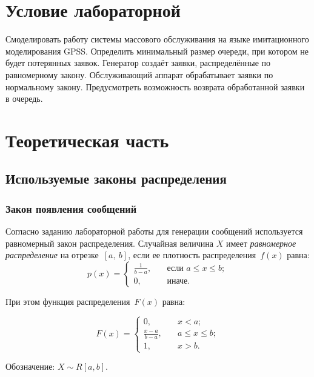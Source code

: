\chapter{Условие лабораторной}

Смоделировать работу системы массового обслуживания на языке имитационного моделирования GPSS. Определить минимальный размер очереди,
при котором не будет потерянных заявок.
Генератор создаёт заявки, распределённые по равномерному закону.
Обслуживающий аппарат обрабатывает заявки по нормальному закону. Предусмотреть возможность возврата обработанной
заявки в очередь.


\chapter{Теоретическая часть}

\section{Используемые законы распределения}

\subsection*{Закон появления сообщений}

Согласно заданию лабораторной работы для генерации сообщений используется равномерный закон распределения.
Случайная величина $X$ имеет \textit{равномерное распределение} на отрезке~$[a,~b]$, если ее плотность распределения~$f(x)$ равна:
\begin{equation}
	p(x) =
	\begin{cases}
		\displaystyle\frac{1}{b - a}, & \quad \text{если } a \leq x \leq b;\\
		0,  & \quad \text{иначе}.
	\end{cases}
\end{equation}

При этом функция распределения~$F(x)$ равна:

\begin{equation}
	F(x) =
	\begin{cases}
		0,  & \quad x < a;\\
		\displaystyle\frac{x - a}{b - a}, & \quad a \leq x \leq b;\\
		1,  & \quad x > b.
	\end{cases}
\end{equation}

Обозначение: $X \sim R[a, b]$.

